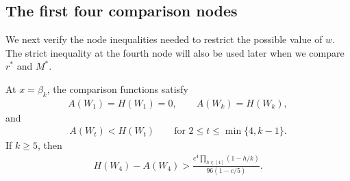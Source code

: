 \subsection{The first four comparison nodes}

We next verify the node inequalities needed to restrict the possible value of $w$. The strict inequality at the fourth node will also be used later when we compare $r^*$ and $M^*$.

\begin{lemma}\label{lem:node-estimates}
At $x=\beta_k$, the comparison functions satisfy
\begin{align}\label{eq:appendix-endpoint-nodes}
A(W_1)=H(W_1)=0,\qquad A(W_k)=H(W_k),
\end{align}
and
\begin{align}\label{eq:appendix-strict-nodes}
A(W_t)<H(W_t)\qquad\text{for }2\le t\le\min\{4,k-1\}.
\end{align}
If $k\ge5$, then
\begin{align}\label{eq:appendix-fourth-node-gap}
H(W_4)-A(W_4)>
\frac{c^4\prod_{h\in[4]}(1-h/k)}{96(1-c/5)}.
\end{align}
\end{lemma}

